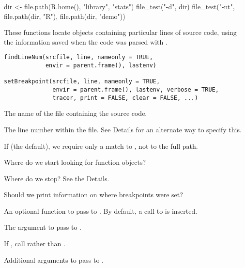 %
\begin{Examples}
\begin{ExampleCode}
dir <- file.path(R.home(), "library", "stats")
file_test("-d", dir)
file_test("-nt", file.path(dir, "R"), file.path(dir, "demo"))
\end{ExampleCode}
\end{Examples}
%
\begin{Description}\relax
These functions locate objects containing particular lines of source
code, using the information saved when the code was parsed with
.
\end{Description}
%
\begin{Usage}
\begin{verbatim}
findLineNum(srcfile, line, nameonly = TRUE,
            envir = parent.frame(), lastenv)

setBreakpoint(srcfile, line, nameonly = TRUE,
              envir = parent.frame(), lastenv, verbose = TRUE,
              tracer, print = FALSE, clear = FALSE, ...)
\end{verbatim}
\end{Usage}
%
\begin{Arguments}
\begin{ldescription}
\item[\code{srcfile}] The name of the file containing the source code.
\item[\code{line}] The line number within the file.  See Details for an
alternate way to specify this.
\item[\code{nameonly}] If  (the default), we require only a match
to , not to the full path.
\item[\code{envir}] Where do we start looking for function objects?
\item[\code{lastenv}] Where do we stop?  See the Details.
\item[\code{verbose}] Should we print information on where breakpoints were set?
\item[\code{tracer}] An optional  function to pass to
.  By default, a call to 
is inserted.
\item[\code{print}] The  argument to pass to .
\item[\code{clear}] If , call  rather than 
.
\item[\code{...}] Additional arguments to pass to .
\end{ldescription}
\end{Arguments}
